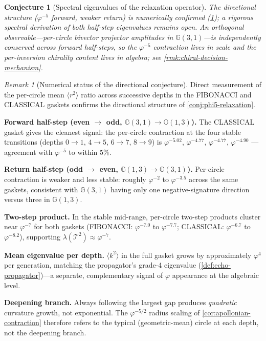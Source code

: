 \documentclass[11pt,a4paper]{article}
\theoremstyle{plain}
\newtheorem{conjecture}[theorem]{Conjecture}
\theoremstyle{definition}
\theoremstyle{remark}
\newtheorem{remark}[theorem]{Remark}
\numberwithin{equation}{section}
\newcommand{\Cl}{\mathbb{G}}
\newcommand{\vp}{\varphi}
\begin{document}
\begin{conjecture}[Spectral eigenvalues of the relaxation operator]
The directional structure (\(\vp^{-5}\) forward, weaker return)
is numerically confirmed (\cref{rmk:phi5-numerical-status}); a
rigorous spectral derivation of both half-step eigenvalues remains
open.  An orthogonal observable---per-circle bivector projector
amplitudes in \(\Cl(3,1)\)---is independently \emph{conserved}
across forward half-steps, so the \(\vp^{-5}\) contraction lives in
scale and the per-inversion chirality content lives in algebra; see
\cref{rmk:chiral-decision-mechanism}.
\end{conjecture}

\begin{remark}[Numerical status of the directional conjecture]
\label{rmk:phi5-numerical-status}
Direct measurement of the per-circle mean \(\langle r^2\rangle\) ratio
across successive depths in the FIBONACCI and CLASSICAL gaskets
confirms the directional structure of \cref{conj:phi5-relaxation}.

\textbf{Forward half-step (even \(\to\) odd, \(\Cl(3,1)\to\Cl(1,3)\)).}
The CLASSICAL gasket gives the cleanest signal: the per-circle
contraction at the four stable transitions
(depths \(0{\to}1\), \(4{\to}5\), \(6{\to}7\), \(8{\to}9\))
is \(\vp^{-5.02}\), \(\vp^{-4.77}\), \(\vp^{-4.77}\), \(\vp^{-4.90}\) ---
agreement with \(\vp^{-5}\) to within \(5\%\).

\textbf{Return half-step (odd \(\to\) even, \(\Cl(1,3)\to\Cl(3,1)\)).}
Per-circle contraction is weaker and less stable: roughly
\(\vp^{-2}\) to \(\vp^{-3.5}\) across the same gaskets, consistent with
\(\Cl(3,1)\) having only one negative-signature direction versus three
in \(\Cl(1,3)\).

\textbf{Two-step product.}
In the stable mid-range, per-circle two-step products cluster near
\(\vp^{-7}\) for both gaskets (FIBONACCI: \(\vp^{-7.0}\) to \(\vp^{-7.7}\);
CLASSICAL: \(\vp^{-6.7}\) to \(\vp^{-8.2}\)), supporting
\(\lambda(\mathcal{T}^2)\approx\vp^{-7}\).

\textbf{Mean eigenvalue per depth.}
\(\langle k^2\rangle\) in the full gasket grows by approximately
\(\vp^{4}\) per generation, matching the propagator's grade-4 eigenvalue
(\cref{def:echo-propagator})---a separate, complementary signal of
\(\vp\) appearance at the algebraic level.

\textbf{Deepening branch.}
Always following the largest gap produces \emph{quadratic} curvature
growth, not exponential.  The \(\vp^{-5/2}\) radius scaling of
\cref{cor:apollonian-contraction} therefore refers to the typical
(geometric-mean) circle at each depth, not the deepening branch.


\end{remark}
\end{document}
